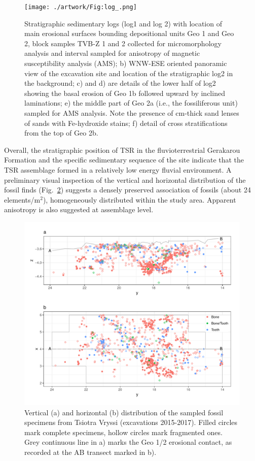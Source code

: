\documentclass[review,times,authoryear]{elsarticle} %
\begin{document}
\begin{figure}
  \centering
  \texttt{[image: ./artwork/Fig:log\_.png]}
  \caption{Stratigraphic sedimentary logs (log1 and log 2) with location of main erosional surfaces bounding depositional units Geo 1 and Geo 2, block samples TVB-Z 1 and 2 collected for micromorphology analysis and interval sampled for anisotropy of magnetic susceptibility analysis (AMS); b) WNW-ESE oriented panoramic view of the excavation site and location of the stratigraphic log2 in the background; c) and d) are details of the lower half of log2 showing the basal erosion of Geo 1b followed upward by inclined laminations; e) the middle part of Geo 2a (i.e., the fossiliferous unit) sampled for AMS analysis. Note the presence of cm-thick sand lenses of sands with Fe-hydroxide stains; f) detail of cross stratifications from the top of Geo 2b.}
  \label{fig:log}
\end{figure}

Overall, the stratigraphic position of TSR in the fluvioterrestrial Gerakarou Formation \citep{Koufos1995} and the specific sedimentary sequence of the site indicate that the TSR assemblage formed in a relatively low energy fluvial environment. A preliminary visual inspection of the vertical and horizontal distribution of the fossil finds (Fig.~\ref{fig:map}) suggests a densely preserved association of fossils (about 24 elements/m$^2$), homogeneously distributed within the study area. Apparent anisotropy is also suggested at assemblage level.

\begin{figure}[]
  \centering
  \includegraphics[width=1\textwidth]{./artwork/Fig:map_.pdf}
  \caption{Vertical (a) and horizontal (b) distribution of the sampled fossil specimens from Tsiotra Vryssi (excavations 2015-2017). Filled circles mark complete specimens, hollow circles mark fragmented ones. Grey continuous line in a) marks the Geo 1/2 erosional contact, as recorded at the AB transect marked in b).}
  \label{fig:map}
\end{figure}
\end{document}
